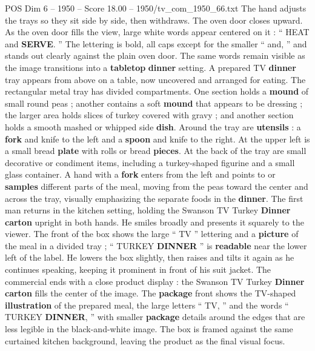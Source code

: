 \begin{textsample}{POS Dim 6 – 1950 – Score 18.00 – 1950/tv\_com\_1950\_66.txt}
The hand adjusts the trays so they sit side by side, then withdraws.
The oven door closes upward.
As the oven door fills the view, large white words appear centered on it : “ HEAT and \textbf{SERVE}. ” The lettering is bold, all caps except for the smaller “ and, ” and stands out clearly against the plain oven door.
The same words remain visible as the image transitions into a \textbf{tabletop} \textbf{dinner} setting.
A prepared TV \textbf{dinner} tray appears from above on a table, now uncovered and arranged for eating.
The rectangular metal tray has divided compartments.
One section holds a \textbf{mound} of small round peas ; another contains a soft \textbf{mound} that appears to be dressing ; the larger area holds slices of turkey covered with gravy ; and another section holds a smooth mashed or whipped side \textbf{dish}.
Around the tray are \textbf{utensils} : a \textbf{fork} and knife to the left and a \textbf{spoon} and knife to the right.
At the upper left is a small bread \textbf{plate} with rolls or bread \textbf{pieces}.
At the back of the tray are small decorative or condiment items, including a turkey-shaped figurine and a small glass container.
A hand with a \textbf{fork} enters from the left and points to or \textbf{samples} different parts of the meal, moving from the peas toward the center and across the tray, visually emphasizing the separate foods in the \textbf{dinner}.
The first man returns in the kitchen setting, holding the Swanson TV Turkey \textbf{Dinner} \textbf{carton} upright in both hands.
He smiles broadly and presents it squarely to the viewer.
The front of the box shows the large “ TV ” lettering and a \textbf{picture} of the meal in a divided tray ; “ TURKEY \textbf{DINNER} ” is \textbf{readable} near the lower left of the label.
He lowers the box slightly, then raises and tilts it again as he continues speaking, keeping it prominent in front of his suit jacket.
The commercial ends with a close product display : the Swanson TV Turkey \textbf{Dinner} \textbf{carton} fills the center of the image.
The \textbf{package} front shows the TV-shaped \textbf{illustration} of the prepared meal, the large letters “ TV, ” and the words “ TURKEY \textbf{DINNER}, ” with smaller \textbf{package} details around the edges that are less legible in the black-and-white image.
The box is framed against the same curtained kitchen background, leaving the product as the final visual focus.

\end{textsample}
